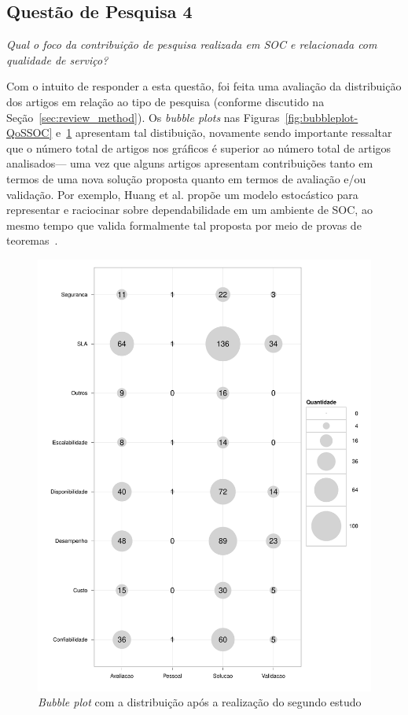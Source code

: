 \subsection{Questão de Pesquisa 4}

\emph{Qual o foco da contribuição de pesquisa realizada em SOC e relacionada com qualidade de serviço? }

Com o intuito de responder a esta questão, foi feita uma avalia\c c\~{a}o da distribui\c c\~{a}o dos 
artigos em rela\c c\~{a}o ao tipo de pesquisa (conforme discutido na Se\c c\~{a}o~\ref{sec:review_method}). 
Os \emph{bubble plots} nas Figuras~\ref{fig:bubbleplot-QoSSOC} e~\ref{fig:bubbleplot-QoSRes}  apresentam tal distibui\c c\~{a}o, novamente sendo importante ressaltar que o n\'{u}mero total de artigos nos gr\'{a}ficos \'{e} superior ao n\'{u}mero total de artigos analisados--- uma vez que alguns artigos apresentam contribui\c c\~{o}es tanto em termos de uma nova solu\c c\~{a}o proposta quanto em termos de avalia\c c\~{a}o e/ou valida\c c\~{a}o. Por exemplo, Huang et al. prop\~{o}e um modelo estoc\'{a}stico para representar e raciocinar sobre dependabilidade em um ambiente de SOC, ao mesmo tempo que valida formalmente tal proposta por meio de provas de teoremas~\cite{huang:scc2011}.

\begin{figure}[htb]
\centering
\includegraphics[scale=0.55]{imagens/pesquisaContexto.pdf}
\caption{\emph{Bubble plot} com a distribui\c{c}\~{a}o ap\'{o}s a realiza\c{c}\~{a}o do segundo estudo}
\label{fig:bubbleplot-QoSRes}
\end{figure}

